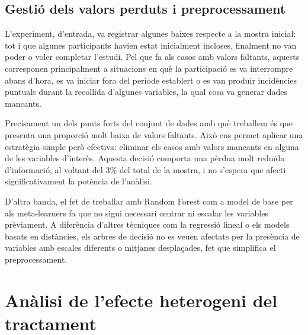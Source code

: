 \documentclass[../main.tex]{subfiles}
\begin{document}
    \FloatBarrier
    \subsection{Gestió dels valors perduts i preprocessament} \label{subsec:preproces}

    L’experiment, d’entrada, va registrar algunes baixes respecte a la mostra inicial: tot i que algunes participants havien estat inicialment incloses, finalment no van poder o voler completar l’estudi. Pel que fa als casos amb valors faltants, aquests corresponen principalment a situacions en què la participació es va interrompre abans d’hora, es va iniciar fora del període establert o es van produir incidències puntuals durant la recollida d’algunes variables, la qual cosa va generar dades mancants.\par
    Precísament un dels punts forts del conjunt de dades amb què treballem és que presenta una proporció molt baixa de valors faltants. Això ens permet aplicar una estratègia simple però efectiva: eliminar els casos amb valors mancants en alguna de les variables d’interès. Aquesta decisió comporta una pèrdua molt reduïda d’informació, al voltant del 3\% del total de la mostra, i no s’espera que afecti significativament la potència de l’anàlisi.\par
    D’altra banda, el fet de treballar amb Random Forest com a model de base per als meta-learners fa que no sigui necessari centrar ni escalar les variables prèviament. A diferència d’altres tècniques com la regressió lineal o els models basats en distàncies, els arbres de decisió no es veuen afectats per la presència de variables amb escales diferents o mitjanes desplaçades, fet que simplifica el preprocessament.

    
    \section{Anàlisi de l’efecte heterogeni del tractament} \label{sec:analHTE}
    
\end{document}
